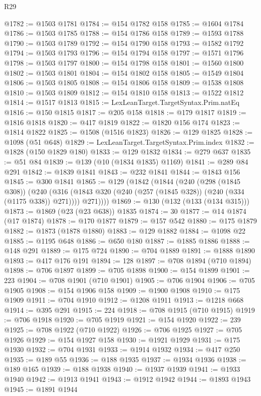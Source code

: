 \begin{lexlean}{R29}
\begin{coremodule}
@1782 := @1503 @1781
@1784 := @154 @1782 @158
@1785 := @1604 @1784
@1786 := @1503 @1785
@1788 := @154 @1786 @158
@1789 := @1593 @1788
@1790 := @1503 @1789
@1792 := @154 @1790 @158
@1793 := @1582 @1792
@1794 := @1503 @1793
@1796 := @154 @1794 @158
@1797 := @1571 @1796
@1798 := @1503 @1797
@1800 := @154 @1798 @158
@1801 := @1560 @1800
@1802 := @1503 @1801
@1804 := @154 @1802 @158
@1805 := @1549 @1804
@1806 := @1503 @1805
@1808 := @154 @1806 @158
@1809 := @1538 @1808
@1810 := @1503 @1809
@1812 := @154 @1810 @158
@1813 := @1522 @1812
@1814 := @1517 @1813
@1815 := LexLeanTarget.TargetSyntax.Prim.natEq
@1816 := @150 @1815
@1817 := @205 @158
@1818 := @179 @1817
@1819 := @1816 @1818
@1820 := @417 @1819
@1822 := @1820 @156 @174
@1823 := @1814 @1822
@1825 := @1508 (@1516 @1823)
@1826 := @129 @1825
@1828 := @1098 (@51 @648)
@1829 := LexLeanTarget.TargetSyntax.Prim.index
@1832 := @1828 (@150 @1829 @180)
@1833 := @129 @1832
@1834 := @279 @637
@1835 := @51 @84
@1839 := @139 (@10 (@1834 @1835) @1169)
@1841 := @289 @84 @291
@1842 := @1839 @1841
@1843 := @232 @1841
@1844 := @1843 @156
@1845 := @300 @1841
@1865 := @129
    (@1842
      (@1844
        (@240
          (@298 (@1845 @308))
          (@240
            (@316 (@1843 @320 (@240 (@257 (@1845 @328)) (@240 (@334 (@1175 @338)) @271))))
            @271))))
@1869 := @130 (@132 (@133 (@134 @315)))
@1873 := @1869 (@23 (@23 @638)) @1835
@1874 := 30
@1877 := @14 @1874 (@17 @1874)
@1878 := @170 @1877
@1879 := @157 @542
@1880 := @175 @1879
@1882 := @1873 (@1878 @1880)
@1883 := @129 @1882
@1884 := @1098 @22
@1885 := @1195 @648
@1886 := @650 @180
@1887 := @1885 @1886
@1888 := @148 @291
@1889 := @175 @724
@1890 := @704 @1889
@1891 := @1888 @1890
@1893 := @417 @176 @191
@1894 := 128
@1897 := @708 @1894 (@710 @1894)
@1898 := @706 @1897
@1899 := @705 @1898
@1900 := @154 @1899
@1901 := 223
@1904 := @708 @1901 (@710 @1901)
@1905 := @706 @1904
@1906 := @705 @1905
@1908 := @154 @1906 @158
@1909 := @1900 @1908
@1910 := @175 @1909
@1911 := @704 @1910
@1912 := @1208 @1911
@1913 := @1218 @668
@1914 := @395 @291
@1915 := 224
@1918 := @708 @1915 (@710 @1915)
@1919 := @706 @1918
@1920 := @705 @1919
@1921 := @154 @1920
@1922 := 239
@1925 := @708 @1922 (@710 @1922)
@1926 := @706 @1925
@1927 := @705 @1926
@1929 := @154 @1927 @158
@1930 := @1921 @1929
@1931 := @175 @1930
@1932 := @704 @1931
@1933 := @1914 @1932
@1934 := @417 @250
@1935 := @189 @55
@1936 := @188 @1935
@1937 := @1934 @1936
@1938 := @189 @165
@1939 := @188 @1938
@1940 := @1937 @1939
@1941 := @1933 @1940
@1942 := @1913 @1941
@1943 := @1912 @1942
@1944 := @1893 @1943
@1945 := @1891 @1944

\end{coremodule}
\end{lexlean}
